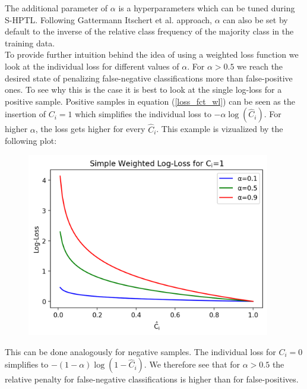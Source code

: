 \documentclass[12pt,titlepage]{article}
\begin{document}
\noindent
The additional parameter of $\alpha$ is a hyperparameters which can be tuned during S-HPTL. Following Gattermann Itschert et al. \cite{multiplets} approach, $\alpha$ can also be set by default to the inverse of the relative class frequency of the majority class in the training data. \\
To provide further intuition behind the idea of using a weighted loss function we look at the individual loss for different values of $\alpha$. For $\alpha>0.5$ we reach the desired state of penalizing false-negative classifications more than false-positive ones. To see why this is the case it is best to look at the single log-loss for a positive sample. Positive samples in equation (\ref{loss_fct_wl}) can be seen as the insertion of $C_{i}=1$ which simplifies the individual loss to $-\alpha \log(\hat{C}_{i})$. For higher $\alpha$, the loss gets higher for every $\hat{C}_{i}$. This example is vizualized by the following plot: \\
\begin{figure}[H]
    \centerline{\includegraphics[height=8cm]{weighted_loss.png}}
\end{figure}
\noindent
This can be done analogously for negative samples. The individual loss for $C_{i}=0$ simplifies to $-(1-\alpha)\log(1-\hat{C}_{i})$. We therefore see that for $\alpha>0.5$ the relative penalty for false-negative classifications is higher than for false-positives. \\
\end{document}
